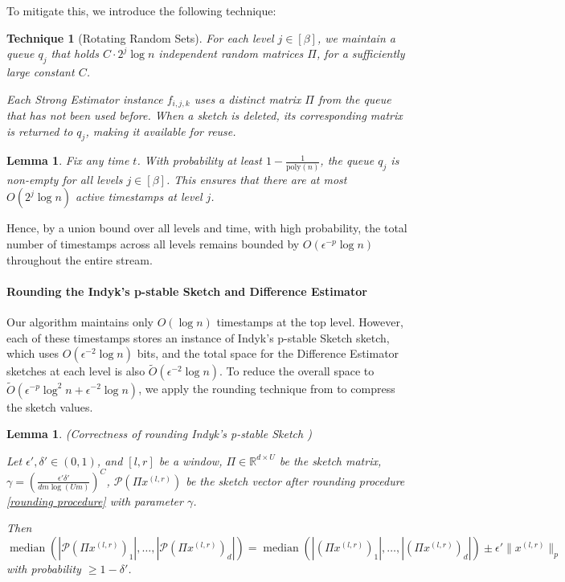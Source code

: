 \documentclass{article}
\newcommand{\est}{\textsf{Strong Estimator }}
\DeclareMathOperator{\med}{median}
\newcommand{\ind}{\textsf{Indyk's p-stable Sketch }}
\newcommand{\dif}{\textsf{Difference Estimator }}
\theoremstyle{plain}
\newtheorem{lem}[theorem]{Lemma}
\newtheorem{tech}[theorem]{Technique}
\begin{document}
To mitigate this, we introduce the following technique:

\begin{tech}[Rotating Random Sets] For each level $j \in [\beta]$, we maintain a queue $q_j$ that holds $C \cdot 2^j \log n$ independent random matrices $\Pi$, for a sufficiently large constant $C$.

Each \est instance $f_{i,j,k}$ uses a distinct matrix $\Pi$ from the queue that has not been used before. When a sketch is deleted, its corresponding matrix is returned to $q_j$, making it available for reuse. \end{tech}

\begin{lem}\label{rotating} Fix any time $t$. With probability at least $1 - \frac{1}{\text{poly}(n)}$, the queue $q_j$ is non-empty for all levels $j \in [\beta]$. This ensures that there are at most $O(2^j \log n)$ active timestamps at level $j$.  \end{lem}

Hence, by a union bound over all levels and time, with high probability, the total number of timestamps across all levels remains bounded by $O(\epsilon^{-p} \log n)$ throughout the entire stream.

\paragraph{Rounding the \ind and \dif} Our algorithm maintains only $O(\log n)$ timestamps at the top level. However, each of these timestamps stores an instance of \ind sketch, which uses $O(\epsilon^{-2} \log n)$ bits, and the total space for the \dif sketches at each level is also $\tilde{O}(\epsilon^{-2} \log n)$. To reduce the overall space to $\tilde{O}(\epsilon^{-p} \log^2 n+ \epsilon ^ {-2}\log n)$, we apply the rounding technique from \cite{rounding} to compress the sketch values.



\begin{lem} (Correctness of rounding \ind)\label{rounding ind}
    
    Let $\epsilon', \delta' \in (0, 1)$, and $[l, r]$ be a window, $\Pi \in \mathbb{R} ^ {d\times U}$ be the sketch matrix, $\gamma = (\frac{\epsilon'\delta'}{dm \log (Um)}) ^ C$, $\mathcal{P}(\Pi x ^ {(l, r)})$ be the sketch vector after rounding procedure \ref{rounding procedure} with parameter $\gamma$. 
    
    Then $\med(|\mathcal{P}(\Pi x ^ {(l, r)})_1|, \dots, |\mathcal{P}(\Pi x ^ {(l, r)})_d|) = \med(|(\Pi x ^ {(l, r)})_1|, \dots, |(\Pi x ^ {(l, r)})_d|) \pm \epsilon'\|x ^ {(l, r)}\|_p$ with probability $\ge 1- \delta'$.
\end{lem}
\end{document}
